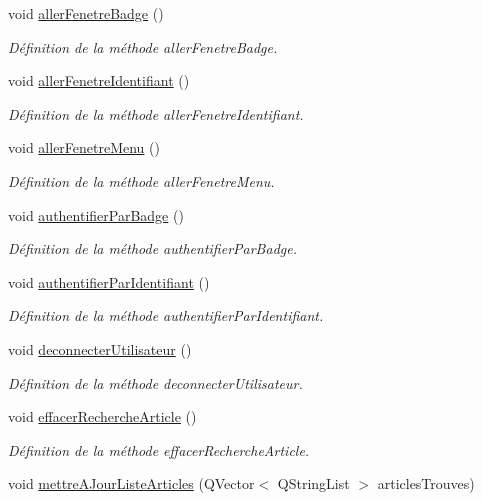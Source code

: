 \begin{DoxyCompactItemize}
void \hyperlink{class_ihm_a08d82e976e48a2f8fced132a4ba22049}{aller\+Fenetre\+Badge} ()
\begin{DoxyCompactList}\small\item\em Définition de la méthode aller\+Fenetre\+Badge. \end{DoxyCompactList}\item 
void \hyperlink{class_ihm_ac464b57ceab0451e8bbc56e40c1bb3a9}{aller\+Fenetre\+Identifiant} ()
\begin{DoxyCompactList}\small\item\em Définition de la méthode aller\+Fenetre\+Identifiant. \end{DoxyCompactList}\item 
void \hyperlink{class_ihm_ad158f31ff15add856dfae37a5f40da27}{aller\+Fenetre\+Menu} ()
\begin{DoxyCompactList}\small\item\em Définition de la méthode aller\+Fenetre\+Menu. \end{DoxyCompactList}\item 
void \hyperlink{class_ihm_abf037b73a8416097f768dd6eb7e20e0e}{authentifier\+Par\+Badge} ()
\begin{DoxyCompactList}\small\item\em Définition de la méthode authentifier\+Par\+Badge. \end{DoxyCompactList}\item 
void \hyperlink{class_ihm_afac914d96f4070dd7fd9e53d4b5989c1}{authentifier\+Par\+Identifiant} ()
\begin{DoxyCompactList}\small\item\em Définition de la méthode authentifier\+Par\+Identifiant. \end{DoxyCompactList}\item 
void \hyperlink{class_ihm_a4c4b8c870f639fba192a3c6eff52883d}{deconnecter\+Utilisateur} ()
\begin{DoxyCompactList}\small\item\em Définition de la méthode deconnecter\+Utilisateur. \end{DoxyCompactList}\item 
void \hyperlink{class_ihm_acb37df89789d7c82be7336519091bc1f}{effacer\+Recherche\+Article} ()
\begin{DoxyCompactList}\small\item\em Définition de la méthode effacer\+Recherche\+Article. \end{DoxyCompactList}\item 
void \hyperlink{class_ihm_a9b30cf664493a0089f95ec8b977a8f1e}{mettre\+A\+Jour\+Liste\+Articles} (Q\+Vector$<$ Q\+String\+List $>$ articles\+Trouves)

\end{DoxyCompactItemize}
